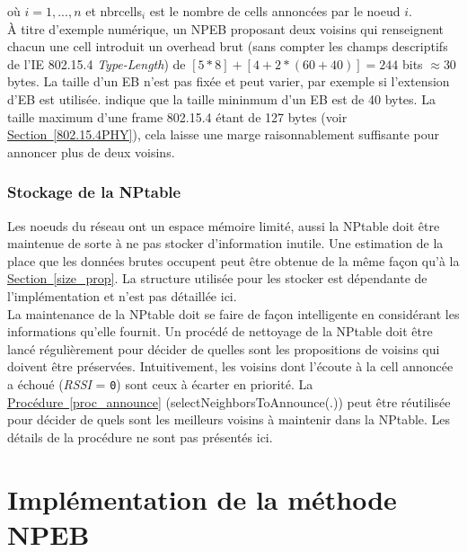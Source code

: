 \documentclass[]{report}
\newcommand{\wordlink}[2]{\hyperref[#2]{#1~\ref{#2}}}
\begin{document}
où $i = 1, ..., n$ et nbrcells$_i$ est le nombre de cells annoncées par le noeud $i$.\\
 
À titre d'exemple numérique, un NPEB proposant deux voisins qui renseignent chacun une cell introduit un overhead brut (sans compter les champs descriptifs de l'IE 802.15.4 \textit{Type-Length}) de $[5*8] + [4+2*(60+40)] = 244$ bits $\approx 30$ bytes. La taille d'un EB n'est pas fixée et peut varier, par exemple si l'extension d'EB \cite{ietf-6tisch-enrollment-enhanced-beacon-14} est utilisée. \cite{ATP} indique que la taille mininmum d'un EB est de 40 bytes. La taille maximum d'une frame 802.15.4 étant de 127 bytes (voir \wordlink{Section}{802.15.4PHY}), cela laisse une marge raisonnablement suffisante pour annoncer plus de deux voisins.

\newpage

\subsubsection{Stockage de la NPtable}

Les noeuds du réseau ont un espace mémoire limité, aussi la NPtable doit être maintenue de sorte à ne pas stocker d'information inutile. Une estimation de la place que les données brutes occupent peut être obtenue de la même façon qu'à la \wordlink{Section}{size_prop}. La structure utilisée pour les stocker est dépendante de l'implémentation et n'est pas détaillée ici.\\

La maintenance de la NPtable doit se faire de façon intelligente en considérant les informations qu'elle fournit. Un procédé de nettoyage de la NPtable doit être lancé régulièrement pour décider de quelles sont les propositions de voisins qui doivent être préservées. Intuitivement, les voisins dont l'écoute à la cell annoncée a échoué (\textit{RSSI} = \texttt{0}) sont ceux à écarter en priorité. La \wordlink{Procédure}{proc_announce} (selectNeighborsToAnnounce(.)) peut être réutilisée pour décider de quels sont les meilleurs voisins à maintenir dans la NPtable. Les détails de la procédure ne sont pas présentés ici.


\section{Implémentation de la méthode NPEB}
\label{implem_NPEB}
\end{document}
